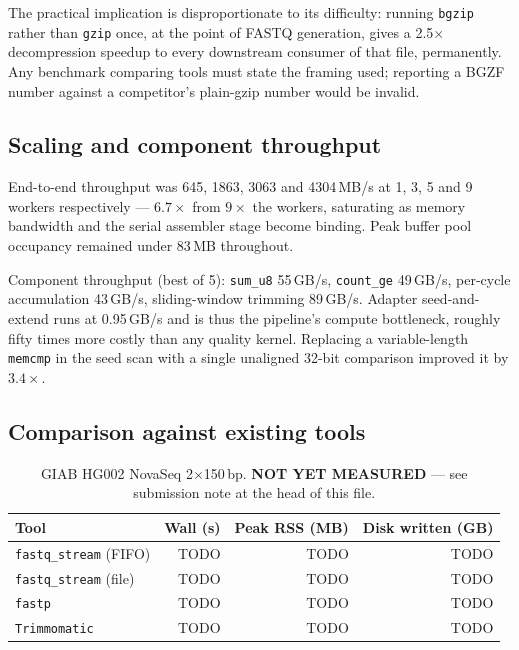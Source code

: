 The practical implication is disproportionate to its difficulty: running
\texttt{bgzip} rather than \texttt{gzip} once, at the point of FASTQ
generation, gives a 2.5$\times$ decompression speedup to every downstream
consumer of that file, permanently. Any benchmark comparing tools must state
the framing used; reporting a BGZF number against a competitor's plain-gzip
number would be invalid.

\subsection{Scaling and component throughput}

End-to-end throughput was 645, 1863, 3063 and 4304\,MB/s at 1, 3, 5 and 9
workers respectively --- $6.7\times$ from $9\times$ the workers, saturating as
memory bandwidth and the serial assembler stage become binding. Peak buffer
pool occupancy remained under 83\,MB throughout.

Component throughput (best of 5): \texttt{sum\_u8} 55\,GB/s, \texttt{count\_ge}
49\,GB/s, per-cycle accumulation 43\,GB/s, sliding-window trimming 89\,GB/s.
Adapter seed-and-extend runs at 0.95\,GB/s and is thus the pipeline's compute
bottleneck, roughly fifty times more costly than any quality kernel. Replacing
a variable-length \texttt{memcmp} in the seed scan with a single unaligned
32-bit comparison improved it by $3.4\times$.

\subsection{Comparison against existing tools}

\begin{table}[h]
\centering
\caption{GIAB HG002 NovaSeq 2$\times$150\,bp. \textbf{NOT YET MEASURED} ---
see submission note at the head of this file.}
\label{tab:baselines}
\small
\begin{tabular}{lrrr}
\toprule
Tool & Wall (s) & Peak RSS (MB) & Disk written (GB) \\
\midrule
\texttt{fastq\_stream} (FIFO) & TODO & TODO & TODO \\
\texttt{fastq\_stream} (file) & TODO & TODO & TODO \\
\texttt{fastp}                & TODO & TODO & TODO \\
\texttt{Trimmomatic}          & TODO & TODO & TODO \\
\bottomrule
\end{tabular}
\end{table}

